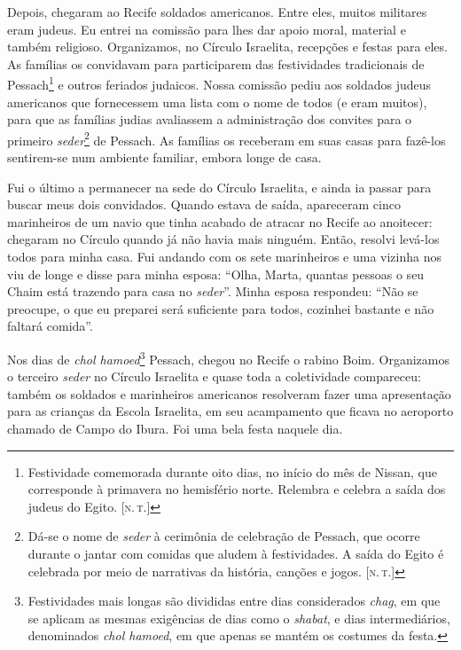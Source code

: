 Depois, chegaram ao Recife soldados americanos. Entre eles, muitos
militares eram judeus. Eu entrei na comissão para lhes dar apoio moral,
material e também religioso. Organizamos, no Círculo Israelita,
recepções e festas para eles. As famílias os convidavam para
participarem das festividades tradicionais de Pessach\footnote{Festividade
  comemorada durante oito dias, no início do mês de Nissan, que
  corresponde à primavera no hemisfério norte. Relembra e celebra a
  saída dos judeus do Egito. {[}\textsc{n.\,t.}{]}} e outros feriados judaicos. Nossa comissão
pediu aos soldados judeus americanos que fornecessem uma lista com o
nome de todos (e eram muitos), para que as famílias
judias avaliassem a administração dos convites para o primeiro
\textit{seder}\footnote{Dá-se o nome de \textit{seder} à cerimônia de celebração de
  Pessach, que ocorre durante o jantar com comidas que aludem à festividades. A saída do Egito é celebrada por meio de narrativas da história, canções e jogos. {[}\textsc{n.\,t.}{]}} de Pessach. As famílias os receberam em suas casas para fazê-los sentirem-se num ambiente familiar, embora longe de casa.

Fui o último a permanecer na sede do Círculo Israelita, e ainda ia passar
para buscar meus dois convidados. Quando
estava de saída, apareceram cinco marinheiros de um navio que tinha
acabado de atracar no Recife ao anoitecer: chegaram no Círculo quando
já não havia mais ninguém. Então, resolvi levá-los todos para minha casa.
Fui andando com os sete marinheiros e uma vizinha nos viu de longe e
disse para minha esposa: ``Olha, Marta, quantas pessoas o seu Chaim está
trazendo para casa no \textit{seder}''. Minha esposa respondeu: ``Não se
preocupe, o que eu preparei será suficiente para todos, cozinhei
bastante e não faltará comida''. 


Nos dias de \textit{chol hamoed}\footnote{Festividades mais longas são divididas
  entre dias considerados \textit{chag}, em que se aplicam as mesmas exigências
  de dias como o \textit{shabat}, e dias intermediários, denominados \textit{chol hamoed},
  em que apenas se mantém os costumes da festa.} Pessach, chegou no
Recife o rabino Boim. Organizamos o terceiro \textit{seder} no Círculo
Israelita e quase toda a coletividade compareceu: também os soldados e
marinheiros americanos resolveram fazer uma apresentação para as
crianças da Escola Israelita, em seu acampamento que ficava no aeroporto
chamado de Campo do Ibura. Foi uma bela festa naquele dia. 

